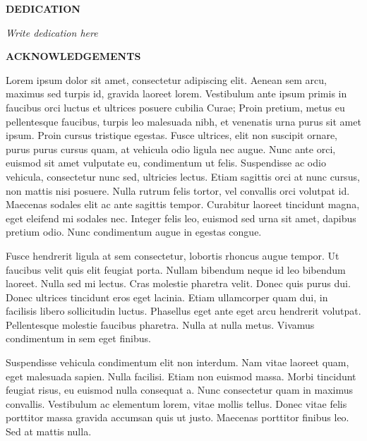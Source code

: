 \documentclass[12pt]{article}
\begin{document}

\newpage

\pagestyle{fancy} \chead{} \rhead{} \lhead{}
 \lfoot{}\cfoot{\thepage}\rfoot{}
\setcounter{page}{2}

\centerline{\large\bf DEDICATION}
\bigskip
\vspace{2.8in}
\vspace{0.5in} \centerline{\em Write dedication here } 

\newpage

\centerline{\large\bf ACKNOWLEDGEMENTS}
Lorem ipsum dolor sit amet, consectetur adipiscing elit. Aenean sem arcu, maximus sed turpis id, gravida laoreet lorem. Vestibulum ante ipsum primis in faucibus orci luctus et ultrices posuere cubilia Curae; Proin pretium, metus eu pellentesque faucibus, turpis leo malesuada nibh, et venenatis urna purus sit amet ipsum. Proin cursus tristique egestas. Fusce ultrices, elit non suscipit ornare, purus purus cursus quam, at vehicula odio ligula nec augue. Nunc ante orci, euismod sit amet vulputate eu, condimentum ut felis. Suspendisse ac odio vehicula, consectetur nunc sed, ultricies lectus. Etiam sagittis orci at nunc cursus, non mattis nisi posuere. Nulla rutrum felis tortor, vel convallis orci volutpat id. Maecenas sodales elit ac ante sagittis tempor. Curabitur laoreet tincidunt magna, eget eleifend mi sodales nec. Integer felis leo, euismod sed urna sit amet, dapibus pretium odio. Nunc condimentum augue in egestas congue.\par
Fusce hendrerit ligula at sem consectetur, lobortis rhoncus augue tempor. Ut faucibus velit quis elit feugiat porta. Nullam bibendum neque id leo bibendum laoreet. Nulla sed mi lectus. Cras molestie pharetra velit. Donec quis purus dui. Donec ultrices tincidunt eros eget lacinia. Etiam ullamcorper quam dui, in facilisis libero sollicitudin luctus. Phasellus eget ante eget arcu hendrerit volutpat. Pellentesque molestie faucibus pharetra. Nulla at nulla metus. Vivamus condimentum in sem eget finibus.\par
Suspendisse vehicula condimentum elit non interdum. Nam vitae laoreet quam, eget malesuada sapien. Nulla facilisi. Etiam non euismod massa. Morbi tincidunt feugiat risus, eu euismod nulla consequat a. Nunc consectetur quam in maximus convallis. Vestibulum ac elementum lorem, vitae mollis tellus. Donec vitae felis porttitor massa gravida accumsan quis ut justo. Maecenas porttitor finibus leo. Sed at mattis nulla.\par
\end{document}
